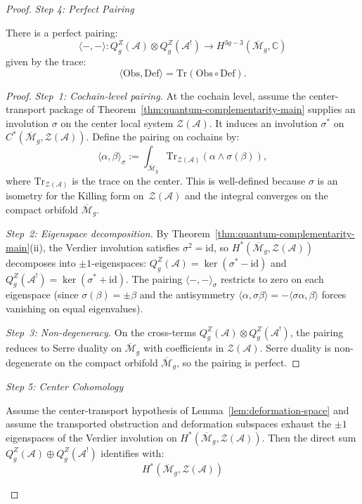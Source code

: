 \begin{proof}
\emph{Step 4: Perfect Pairing}

\begin{lemma}\label{lem:obs-def-pairing}
There is a perfect pairing:
\[\langle -, - \rangle: Q_g^Z(\mathcal{A}) \otimes Q_g^Z(\mathcal{A}^!) \to
H^{3g-3}(\overline{\mathcal{M}}_g, \mathbb{C})\]
given by the trace:
\[\langle \mathrm{Obs}, \mathrm{Def} \rangle = \mathrm{Tr}(\mathrm{Obs} \circ \mathrm{Def}).\]
\end{lemma}

\begin{proof}
\emph{Step~1: Cochain-level pairing.}
At the cochain level, assume the center-transport package of
Theorem~\ref{thm:quantum-complementarity-main} supplies an involution
$\sigma$ on the center local system $\mathcal{Z}(\mathcal{A})$.
It induces an involution
$\sigma^*$ on $C^*(\overline{\mathcal{M}}_g, \mathcal{Z}(\mathcal{A}))$.
Define the pairing on cochains by:
\[
\langle \alpha, \beta \rangle_{\sigma}
:= \int_{\overline{\mathcal{M}}_g}
\mathrm{Tr}_{\mathcal{Z}(\mathcal{A})}(\alpha \wedge \sigma(\beta)),
\]
where $\mathrm{Tr}_{\mathcal{Z}(\mathcal{A})}$ is the trace on the
center. This is well-defined because $\sigma$ is an isometry for the
Killing form on~$\mathcal{Z}(\mathcal{A})$ and the integral converges
on the compact orbifold $\overline{\mathcal{M}}_g$.

\emph{Step~2: Eigenspace decomposition.}
By Theorem~\ref{thm:quantum-complementarity-main}(ii), the Verdier
involution satisfies $\sigma^2 = \mathrm{id}$, so
$H^*(\overline{\mathcal{M}}_g, \mathcal{Z}(\mathcal{A}))$ decomposes
into $\pm 1$-eigenspaces:
$Q_g^Z(\mathcal{A}) = \ker(\sigma^* - \mathrm{id})$ and
$Q_g^Z(\mathcal{A}^!) = \ker(\sigma^* + \mathrm{id})$.
The pairing $\langle -, - \rangle_{\sigma}$ restricts to zero on
each eigenspace (since $\sigma(\beta) = \pm\beta$ and the
antisymmetry $\langle \alpha, \sigma\beta \rangle
= -\langle \sigma\alpha, \beta \rangle$ forces vanishing on
equal eigenvalues).

\emph{Step~3: Non-degeneracy.}
On the cross-terms $Q_g^Z(\mathcal{A}) \otimes Q_g^Z(\mathcal{A}^!)$,
the pairing reduces to Serre duality on $\overline{\mathcal{M}}_g$
with coefficients in $\mathcal{Z}(\mathcal{A})$. Serre duality is
non-degenerate on the compact orbifold $\overline{\mathcal{M}}_g$,
so the pairing is perfect.
\end{proof}

\emph{Step 5: Center Cohomology}

\begin{lemma}\label{lem:center-cohomology}
Assume the center-transport hypothesis of
Lemma~\ref{lem:deformation-space} and assume the transported
obstruction and deformation subspaces exhaust the $\pm1$ eigenspaces
of the Verdier involution on
\(H^*(\overline{\mathcal{M}}_g,\mathcal Z(\mathcal A))\). Then the
direct sum $Q_g^Z(\mathcal{A}) \oplus Q_g^Z(\mathcal{A}^!)$ identifies with:
\[H^*(\overline{\mathcal{M}}_g, \mathcal{Z}(\mathcal{A}))\]
\end{lemma}


\end{proof}
